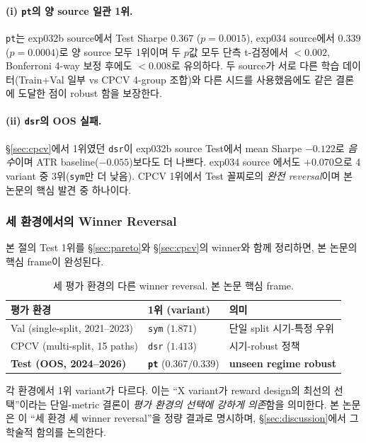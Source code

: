 \documentclass[11pt, a4paper]{article}
\begin{document}
\paragraph{(i) \texttt{pt}의 양 source 일관 1위.}
\texttt{pt}는 exp032b source에서 Test Sharpe $0.367$ ($p = 0.0015$),
exp034 source에서 $0.339$ ($p = 0.0004$)로 양 source 모두 1위이며 두 $p$값
모두 단측 t-검정에서 $< 0.002$, Bonferroni 4-way 보정 후에도 $< 0.008$로
유의하다. 두 source가 서로 다른 학습 데이터(Train+Val 일부 vs CPCV 4-group
조합)와 다른 시드를 사용했음에도 같은 결론에 도달한 점이 robust 함을 보장한다.

\paragraph{(ii) \texttt{dsr}의 OOS 실패.}
\S\ref{sec:cpcv}에서 1위였던 \texttt{dsr}이 exp032b source Test에서 mean Sharpe
$-0.122$로 \emph{음수}이며 ATR baseline($-0.055$)보다도 더 나쁘다. exp034 source
에서도 $+0.070$으로 4 variant 중 3위(\texttt{sym}만 더 낮음). CPCV 1위에서 Test
꼴찌로의 \emph{완전 reversal}이며 본 논문의 핵심 발견 중 하나이다.

\subsubsection{세 환경에서의 Winner Reversal}
\label{sec:oos_three_env_reversal}

본 절의 Test 1위를 \S\ref{sec:pareto}와 \S\ref{sec:cpcv}의 winner와 함께
정리하면, 본 논문의 핵심 frame이 완성된다.

\begin{table}[!htbp]
\centering
\caption{세 평가 환경의 다른 winner reversal. 본 논문 핵심 frame.}
\begin{tabular}{lll}
\toprule
평가 환경 & 1위 (variant) & 의미 \\
\midrule
Val (single-split, 2021--2023) & \texttt{sym} ($1.871$) & 단일 split 시기-특정 우위 \\
CPCV (multi-split, 15 paths) & \texttt{dsr} ($1.413$) & 시기-robust 정책 \\
\textbf{Test (OOS, 2024--2026)} & \textbf{\texttt{pt}} ($0.367 / 0.339$) & \textbf{unseen regime robust} \\
\bottomrule
\end{tabular}
\label{tab:three_env_reversal}
\end{table}

각 환경에서 1위 variant가 다르다. 이는 ``X variant가 reward design의 최선의
선택''이라는 단일-metric 결론이 \emph{평가 환경의 선택에 강하게 의존}함을 의미한다.
본 논문은 이 ``세 환경 세 winner reversal''을 정량 결과로 명시하며,
\S\ref{sec:discussion}에서 그 학술적 함의를 논의한다.
\end{document}
